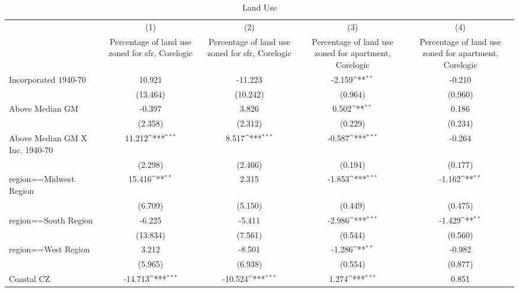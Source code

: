 \begin{table}[htbp]\centering
\def\sym#1{\ifmmode^{#1}\else\(^{#1}\)\fi}
\caption{Land Use}
\begin{tabular}{l*{4}{c}}
\hline\hline
                    &\multicolumn{1}{c}{(1)}&\multicolumn{1}{c}{(2)}&\multicolumn{1}{c}{(3)}&\multicolumn{1}{c}{(4)}\\
                    &\multicolumn{1}{c}{Percentage of land use zoned for sfr, Corelogic}&\multicolumn{1}{c}{Percentage of land use zoned for sfr, Corelogic}&\multicolumn{1}{c}{Percentage of land use zoned for apartment, Corelogic}&\multicolumn{1}{c}{Percentage of land use zoned for apartment, Corelogic}\\
\hline
Incorporated 1940-70&      10.921         &     -11.223         &      -2.159\sym{**} &      -0.210         \\
                    &    (13.464)         &    (10.242)         &     (0.964)         &     (0.960)         \\
[1em]
Above Median GM     &      -0.397         &       3.826         &       0.502\sym{**} &       0.186         \\
                    &     (2.358)         &     (2.312)         &     (0.229)         &     (0.234)         \\
[1em]
Above Median GM X Inc. 1940-70&      11.212\sym{***}&       8.517\sym{***}&      -0.587\sym{***}&      -0.264         \\
                    &     (2.298)         &     (2.466)         &     (0.194)         &     (0.177)         \\
[1em]
region==Midwest Region&      15.416\sym{**} &       2.315         &      -1.853\sym{***}&      -1.162\sym{**} \\
                    &     (6.709)         &     (5.150)         &     (0.449)         &     (0.475)         \\
[1em]
region==South Region&      -6.225         &      -5.411         &      -2.986\sym{***}&      -1.429\sym{**} \\
                    &    (13.834)         &     (7.561)         &     (0.544)         &     (0.560)         \\
[1em]
region==West Region &       3.212         &      -8.501         &      -1.286\sym{**} &      -0.982         \\
                    &     (5.965)         &     (6.938)         &     (0.554)         &     (0.877)         \\
[1em]
Coastal CZ          &     -14.713\sym{***}&     -10.524\sym{***}&       1.274\sym{***}&       0.851         \\

\end{tabular}
\end{table}
